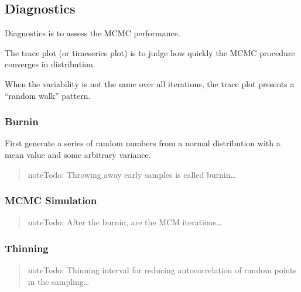 \documentclass[a4paper,12pt,english]{sphinxhowto}
\begin{document}
\subsection{Diagnostics}
\label{\detokenize{MCMC:diagnostics}}
Diagnostics is to assess the MCMC performance.

The trace plot (or time\sphinxhyphen{}series plot) is to judge how quickly the MCMC procedure converges in distribution.

When the variability is not the same over all iterations, the trace plot presents a “random walk” pattern.



\subsubsection{Burn\sphinxhyphen{}in}
\label{\detokenize{MCMC:burn-in}}
First generate a series of random numbers from a normal distribution with a mean value and some arbitrary variance.
\begin{quote}

\begin{sphinxadmonition}{note}{\label{\detokenize{MCMC:id1}}Todo:}
Throwing away early samples is called burn\sphinxhyphen{}in…
\end{sphinxadmonition}
\end{quote}



\subsubsection{MCMC Simulation}
\label{\detokenize{MCMC:mcmc-simulation}}\begin{quote}

\begin{sphinxadmonition}{note}{\label{\detokenize{MCMC:id2}}Todo:}
After the burn\sphinxhyphen{}in, are the MCM iterations…
\end{sphinxadmonition}
\end{quote}



\subsubsection{Thinning}
\label{\detokenize{MCMC:thinning}}\begin{quote}

\begin{sphinxadmonition}{note}{\label{\detokenize{MCMC:id3}}Todo:}
Thinning interval for reducing autocorrelation of random points in the sampling…
\end{sphinxadmonition}
\end{quote}
\end{document}
